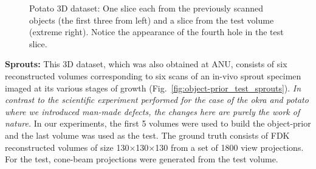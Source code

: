 \documentclass[journal]{IEEEtran}
\begin{document}
\begin{figure}[!h]
\begin{subfigure}[b]{0.235\linewidth}
\captionsetup{labelformat=empty}
\caption{}
\label{fig:potato3D_test}
     \end{subfigure}
      \caption{Potato 3D dataset: One slice each from the previously scanned objects (the first three from left) and a slice from the test 
        volume (extreme right). Notice the appearance of the fourth
        hole in the test slice. }
\label{fig:object-prior_test_potato_A}
\end{figure}

\textbf{Sprouts:} This 3D dataset, which was also obtained at ANU,
consists of six reconstructed volumes corresponding to six scans of an
in-vivo sprout specimen imaged at its various stages of growth
(Fig.~\ref{fig:object-prior_test_sprouts}).  \textit{In contrast to the
scientific experiment performed for the case of the okra and potato
where we introduced man-made defects, the changes here are purely the
work of nature.} In our experiments, the first 5 volumes were used to build the object-prior and the last volume was used as the test. The ground truth consists of FDK reconstructed
volumes of size 130$\times$130$\times$130 from a set of 1800 view
projections. For the test, cone-beam projections were generated from
the test volume. \\
\end{document}
